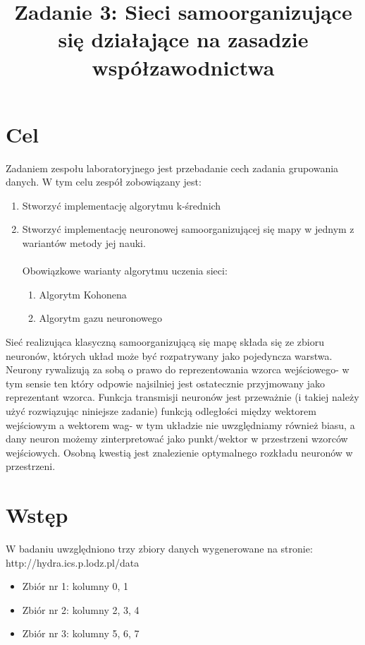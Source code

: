 \documentclass{classrep}
\author{
  \studentinfo{Łukasz Ochmański}{183566} \and
  \studentinfo{Przemysław Szwajkowski}{173524}
}
\title{Zadanie 3: Sieci samoorganizujące się działające na zasadzie współzawodnictwa}
\begin{document}
\maketitle


\section{Cel}
Zadaniem zespołu laboratoryjnego jest przebadanie cech zadania grupowania danych. W tym celu zespół zobowiązany jest:
\begin{enumerate}
    \item Stworzyć implementację algorytmu k-średnich
		\item Stworzyć implementację neuronowej samoorganizującej się mapy w jednym z wariantów metody jej nauki.
\\
\\
Obowiązkowe warianty algorytmu uczenia sieci:
\begin{enumerate}
		\item Algorytm Kohonena
		\item Algorytm gazu neuronowego
		\\
\end{enumerate}
\end{enumerate}


\par
Sieć realizująca klasyczną samoorganizującą się mapę składa się ze zbioru neuronów, których układ może być rozpatrywany jako pojedyncza warstwa. Neurony rywalizują za sobą o prawo do reprezentowania wzorca wejściowego- w tym sensie ten który odpowie najsilniej jest ostatecznie przyjmowany jako reprezentant wzorca. Funkcja transmisji neuronów jest przeważnie (i takiej należy użyć rozwiązując niniejsze zadanie) funkcją odległości między wektorem wejściowym a wektorem wag- w tym układzie nie uwzględniamy również biasu, a dany neuron możemy zinterpretować jako punkt/wektor w przestrzeni wzorców wejściowych. Osobną kwestią jest znalezienie optymalnego rozkładu neuronów w przestrzeni. 

\section{Wstęp}
W badaniu uwzględniono trzy zbiory danych wygenerowane na stronie:
\\
http://hydra.ics.p.lodz.pl/data
\\
\begin{itemize}
\item
Zbiór nr 1: kolumny 0, 1
\item
Zbiór nr 2: kolumny 2, 3, 4
\item
Zbiór nr 3: kolumny 5, 6, 7
\\
\\
\end{itemize}
\end{document}
